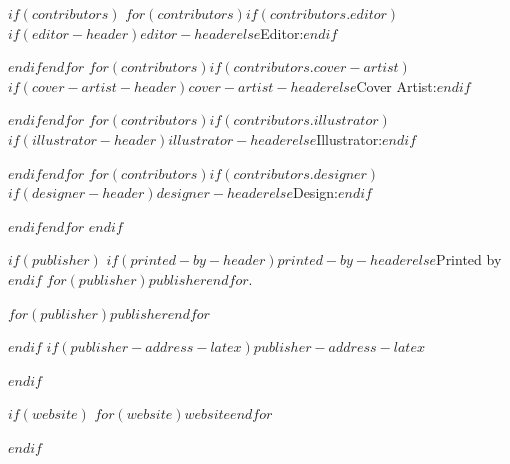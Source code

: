 \begin{singlespacing}
$if(contributors)$
\vspace{0.4cm}
  $for(contributors)$$if(contributors.editor)$\noindent $if(editor-header)$$editor-header$$else$Editor:$endif$ \editor \par$endif$$endfor$
  $for(contributors)$$if(contributors.cover-artist)$\noindent $if(cover-artist-header)$$cover-artist-header$$else$Cover Artist:$endif$ \coverartist \par$endif$$endfor$
  $for(contributors)$$if(contributors.illustrator)$\noindent $if(illustrator-header)$$illustrator-header$$else$Illustrator:$endif$ \illustrator \par$endif$$endfor$
  $for(contributors)$$if(contributors.designer)$\noindent $if(designer-header)$$designer-header$$else$Design:$endif$ \designer \par$endif$$endfor$
$endif$

$if(publisher)$
\vspace{0.4cm}
\noindent $if(printed-by-header)$$printed-by-header$$else$Printed by$endif$ $for(publisher)$$publisher$$endfor$. \par

\vspace{0.4cm}
\noindent $for(publisher)$$publisher$$endfor$ \par
$endif$
$if(publisher-address-latex)$\noindent $publisher-address-latex$ \par $endif$

$if(website)$
\vspace{0.4cm}
\noindent $for(website)$$website$$endfor$ \par
$endif$

\end{singlespacing}
